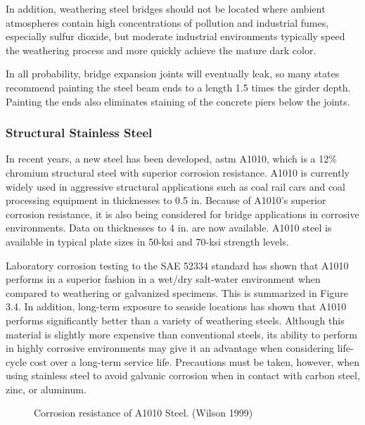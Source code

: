 In addition, weathering steel bridges should not be located where ambient atmospheres contain high
concentrations of pollution and industrial fumes, especially sulfur dioxide, but moderate industrial environments
typically speed the weathering process and more quickly achieve the mature dark color.

In all probability, bridge expansion joints will eventually leak, so many states recommend painting the steel beam
ends to a length 1.5 times the girder depth. Painting the ends also eliminates staining of the concrete piers below the
joints.

\subsubsection{Structural Stainless Steel}

In recent years, a new steel has been developed, \acrshort*{astm} A1010, which is a 12\% chromium structural steel with
superior corrosion resistance. A1010 is currently widely used in aggressive structural applications such as coal rail
cars and coal processing equipment in thicknesses to 0.5 in. Because of A1010’s superior corrosion resistance, it is
also being considered for bridge applications in corrosive environments. Data on thicknesses to 4 in. are now
available. A1010 steel is available in typical plate sizes in 50-ksi and 70-ksi strength levels.

Laboratory corrosion testing to the SAE 52334 standard has shown that A1010 performs in a superior fashion in
a wet/dry salt-water environment when compared to weathering or galvanized specimens. This is summarized in
Figure 3.4. In addition, long-term exposure to seaside locations has shown that A1010 performs significantly better
than a variety of weathering steels. Although this material is slightly more expensive than conventional steels, its
ability to perform in highly corrosive environments may give it an advantage when considering life-cycle cost over a
long-term service life. Precautions must be taken, however, when using stainless steel to avoid galvanic corrosion
when in contact with carbon steel, zinc, or aluminum.

\begin{figure}
  \caption{Corrosion resistance of A1010 Steel. (Wilson 1999)}\label{fig:corrosion-resistance-a1010}
\end{figure}

